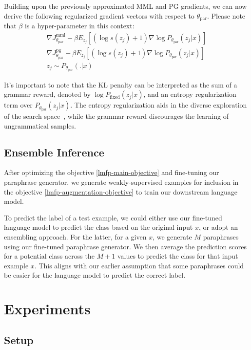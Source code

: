 \documentclass[11pt]{article}
\begin{document}
Building upon the previously approximated MML and PG gradients, we can now derive the following regularized gradient vectors with respect to $\theta_{\text{par}}$. Please note that $\beta$ is a hyper-parameter in this context:
\begin{multline}
\nabla J^{\text{mml}}_{\theta_{\text{par}}} - \beta E_{z_{j}} [(\log s(z_{j}) + 1) \nabla \log P_{\theta_{\text{par}}} (z_{j} | x)] \\
\nabla J^{\text{pg}}_{\theta_{\text{par}}} - \beta E_{z_{j}} [(\log s(z_{j}) + 1) \nabla \log P_{\theta_{\text{par}}} (z_{j} | x)] \\
z_{j} \sim P_{\theta_{\text{par}}}(.|x)
\label{lmfp-expect-ppo-gradient}
\end{multline}

It's important to note that the KL penalty can be interpreted as the sum of a grammar reward, denoted by $\log P_{\text{fixed}}(z_{j}|x)$, and an entropy regularization term over $P_{\theta_{\text{par}}} (z_{j} | x)$. The entropy regularization aids in the diverse exploration of the search space~\cite{DBLP:journals/corr/MnihBMGLHSK16}, while the grammar reward discourages the learning of ungrammatical samples.

\subsection{Ensemble Inference}
After optimizing the objective \ref{lmfp-main-objective} and fine-tuning our paraphrase generator, we generate weakly-supervised examples for inclusion in the objective \ref{lmfp-augmentation-objective} to train our downstream language model.

To predict the label of a test example, we could either use our fine-tuned language model to predict the class based on the original input $x$, or adopt an ensembling approach. For the latter, for a given $x$, we generate $M$ paraphrases using our fine-tuned paraphrase generator. We then average the prediction scores for a potential class across the $M+1$ values to predict the class for that input example $x$. This aligns with our earlier assumption that some paraphrases could be easier for the language model to predict the correct label.
\section{Experiments}

\subsection{Setup}
\end{document}
